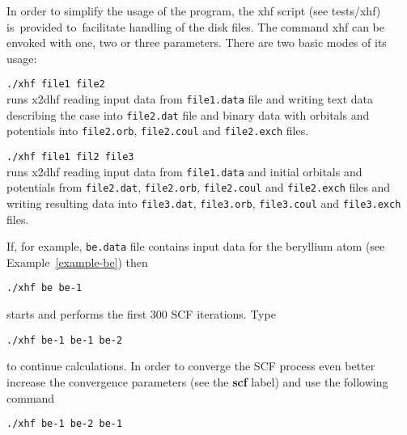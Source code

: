 \documentclass[12pt,a4paper]{article}
\begin{document}
\noindent
In order to simplify the usage of the program, the xhf script (see tests/xhf) is~provided
to~facilitate handling of the disk files.  The command xhf can be envoked with one, two or
three parameters. There are two basic modes of its usage:



\begin{description}
\item \hspace*{0.5cm} \texttt{./xhf file1 file2}\\ runs x2dhf reading
  input data from \texttt{file1.data} file and writing text data
  describing the case into \texttt{file2.dat} file and binary data
  with orbitals and potentials into \texttt{file2.orb},
  \texttt{file2.coul} and \texttt{file2.exch} files.
\end{description}


\begin{description}
\item \hspace*{0.5cm} \texttt{./xhf file1 fil2 file3}\\ runs x2dhf
  reading input data from \texttt{file1.data} and initial orbitals and
  potentials from \texttt{file2.dat}, \texttt{file2.orb},
  \texttt{file2.coul} and \texttt{file2.exch} files and writing
  resulting data into \texttt{file3.dat}, \texttt{file3.orb},
  \texttt{file3.coul} and \texttt{file3.exch} files.
\end{description}

If, for example, \texttt{be.data} file contains input data for
the beryllium atom (see Example~\ref{example-be}) then
\begin{description}
\item \hspace*{0.5cm} \texttt{./xhf be be-1}
\end{description}
starts and performs the first 300 SCF iterations. Type
\begin{description}
\item \hspace*{0.5cm} \texttt{./xhf be-1 be-1 be-2}
\end{description}
to continue calculations. In order to converge the SCF process
even better increase the convergence parameters (see the \textbf{scf}
label) and use the following
command
\begin{description}
\item \hspace*{0.5cm} \texttt{./xhf be-1 be-2 be-1}
\end{description}
\end{document}
